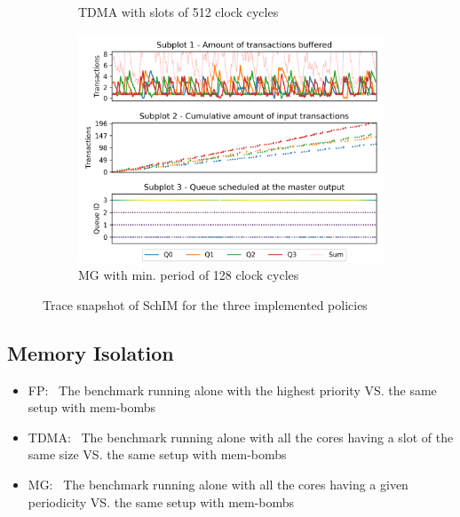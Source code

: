 \begin{figure}
\begin{subfigure}{0.5\textwidth}
        \caption{TDMA with slots of 512 clock cycles}
        \label{fig:schim_behaviour_tdma}
      \end{subfigure}
      \begin{subfigure}{0.5\textwidth}
        \centering
        \includegraphics[scale=0.55]{images/iladata_mg_3_128_128_3.png}
        \caption{MG with min. period of 128 clock cycles}
        \label{fig:schim_behaviour_mg}
      \end{subfigure}
      \caption{Trace snapshot of SchIM for the three implemented policies}
      \label{fig:schim_behaviour}
    \end{figure}

  \subsection{Memory Isolation}
    \begin{itemize}
      \item FP:~ The benchmark running alone with the highest priority VS. the same setup with mem-bombs
      \item TDMA:~ The benchmark running alone with all the cores having a slot of the same size VS. the same setup with mem-bombs
      \item MG:~ The benchmark running alone with all the cores having a given periodicity VS. the same setup with mem-bombs
    \end{itemize}
